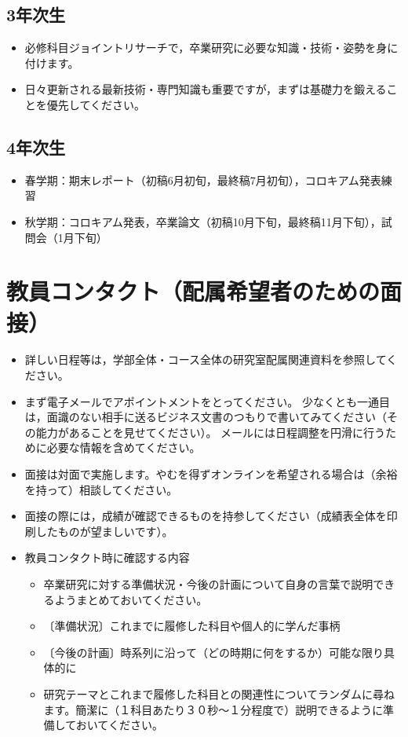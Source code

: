 \documentclass[paper=a4paper,fontsize=10.4pt]{jlreq}
\begin{document}
\subsection*{3年次生}
\vspace{-.2cm}
\begin{itemize}[topsep=0pt]
  \item 必修科目ジョイントリサーチで，卒業研究に必要な知識・技術・姿勢を身に付けます。
  \item 日々更新される最新技術・専門知識も重要ですが，まずは基礎力を鍛えることを優先してください。
\end{itemize}

\subsection*{4年次生}
\begin{itemize}[topsep=0pt]
  \item 春学期：期末レポート（初稿6月初旬，最終稿7月初旬），コロキアム発表練習
  \item 秋学期：コロキアム発表，卒業論文（初稿10月下旬，最終稿11月下旬），試問会（1月下旬）
\end{itemize}

\section{教員コンタクト（配属希望者のための面接）}

\begin{itemize}[topsep=0pt]
  \item 詳しい日程等は，学部全体・コース全体の研究室配属関連資料を参照してください。
  \item まず電子メールでアポイントメントをとってください。
    少なくとも一通目は，面識のない相手に送るビジネス文書のつもりで書いてみてください（その能力があることを見せてください）。
    メールには日程調整を円滑に行うために必要な情報を含めてください。
  \item 面接は対面で実施します。やむを得ずオンラインを希望される場合は（余裕を持って）相談してください。
  \item 面接の際には，成績が確認できるものを持参してください（成績表全体を印刷したものが望ましいです）。
  \item 教員コンタクト時に確認する内容
    \begin{itemize}
      \item 卒業研究に対する準備状況・今後の計画について自身の言葉で説明できるようまとめておいてください。
      \item 〔準備状況〕これまでに履修した科目や個人的に学んだ事柄
      \item 〔今後の計画〕時系列に沿って（どの時期に何をするか）可能な限り具体的に
      \item 研究テーマとこれまで履修した科目との関連性についてランダムに尋ねます。簡潔に（１科目あたり３０秒～１分程度で）説明できるように準備しておいてください。
    \end{itemize}
\end{itemize}
\end{document}
